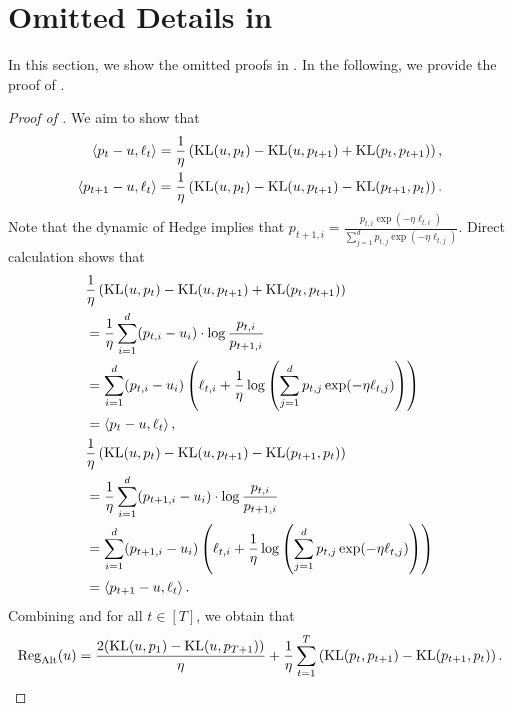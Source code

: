 \section{Omitted Details in }\label{app:CEW}
In this section, we show the omitted proofs in . In the following, we provide the proof of .

\begin{proof}[Proof of ]
    We aim to show that
    \begin{align}
        \left\langle {p_t-u,\ell_t} \right\rangle &= \frac{1}{\eta}\left(\text{\rm KL}(u,p_t) - \text{\rm KL}(u,p_{t+1}) + \text{\rm KL}(p_t,p_{t+1})\right),\label{eqn:regular-expert}\\
        \left\langle {p_{t+1}-u, \ell_t} \right\rangle &= \frac{1}{\eta}\left(\text{\rm KL}(u,p_t) - \text{\rm KL}(u,p_{t+1}) - \text{\rm KL}(p_{t+1},p_{t})\right).\label{eqn:cheat-expert}
    \end{align}
    Note that the dynamic of Hedge implies that $p_{t+1,i}=\frac{p_{t,i}\exp(-\eta\ell_{t,i})}{\sum_{j=1}^dp_{t,j}\exp(-\eta\ell_{t,j})}$. Direct calculation shows that
    \begin{align*}
        &\frac{1}{\eta}\left(\text{\rm KL}(u,p_t) - \text{\rm KL}(u,p_{t+1}) + \text{\rm KL}(p_t,p_{t+1})\right)
        \\
        &= \frac{1}{\eta}\sum_{i=1}^d (p_{t,i}-u_i)\cdot\log\frac{p_{t,i}}{p_{t+1,i}} \\
        &= \sum_{i=1}^d (p_{t,i}-u_i)\left(\ell_{t,i} + \frac{1}{\eta}\log\left(\sum_{j=1}^dp_{t,j}\exp(-\eta\ell_{t,j})\right)\right) \\
        &=\left\langle {p_t-u,\ell_t} \right\rangle,\\
        &\frac{1}{\eta}\left(\text{\rm KL}(u,p_t) - \text{\rm KL}(u,p_{t+1}) - \text{\rm KL}(p_{t+1},p_{t})\right)
        \\
        &= \frac{1}{\eta}\sum_{i=1}^d (p_{t+1,i}-u_i)\cdot\log\frac{p_{t,i}}{p_{t+1,i}} \\
        &= \sum_{i=1}^d (p_{t+1,i}-u_i)\left(\ell_{t,i} + \frac{1}{\eta}\log\left(\sum_{j=1}^dp_{t,j}\exp(-\eta\ell_{t,j})\right)\right) \\
        &=\left\langle {p_{t+1}-u,\ell_t} \right\rangle.
    \end{align*}
    Combining  and  for all $t\in[T]$, we obtain that
    \begin{align}\label{eqn:alt-regret-simplex}
        \mathrm{Reg}_{\mathrm{Alt}}(u) = \frac{2(\text{\rm KL}(u,p_1)-\text{\rm KL}(u,p_{T+1}))}{\eta} + \frac{1}{\eta}\sum_{t=1}^T\left(\text{\rm KL}(p_t,p_{t+1})- \text{\rm KL}(p_{t+1},p_t)\right).
    \end{align}

\end{proof}
